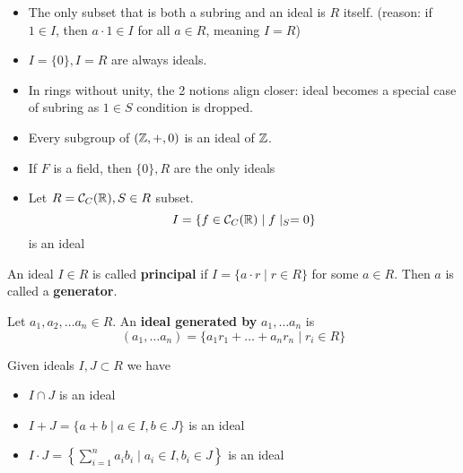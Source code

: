 \begin{rmk}\hspace{0.5cm}
    \begin{itemize}
        \item The only subset that is both a subring and an ideal is $R$ itself.
        (reason: if $1 \in I$, then $a \cdot 1 \in I$ for all $a \in R$, meaning $I = R$)
        \item $I = \{0\}, I = R$ are always ideals.
        \item In rings without unity, the 2 notions align closer: ideal becomes a special
        case of subring as $1 \in S$ condition is dropped.
    \end{itemize}
\end{rmk}
\begin{ex} \hspace{0.5cm}
    \begin{itemize}
        \item Every subgroup of $(\mathbb{Z}, +, 0)$ is an ideal of $\mathbb{Z}$.
        \item If $F$ is a field, then $\{0\}, R$ are the only ideals
        \item Let $R = \mathcal{C}_C(\mathbb{R}), S \in R$ subset.
        $$
        I = \{f \in \mathcal{C}_C(\mathbb{R}) \mid f \mid_{S} = 0 \}
        $$
        is an ideal
    \end{itemize}
\end{ex}
\begin{defn} \label{Defn 10, Jan 4}
    An ideal $I \in R$ is called \textbf{principal} if $I = \{a \cdot r \mid r \in R\}$
    for some $a \in R$. Then $a$ is called a \textbf{generator}.
\end{defn}
\begin{defn} \label{Defn 11, Jan 4}
    Let $a_1, a_2, \dots a_n \in R$. An \textbf{ideal generated by} $a_1, \dots a_n$ is
    $$
    (a_1, \dots a_n) = \{a_1r_1 + \dots + a_nr_n \mid r_i \in R\}
    $$
\end{defn}
\begin{fact} \label{Fact 12, Jan 4}
    Given ideals $I, J \subset R$ we have
    \begin{itemize}
        \item $I \cap J$ is an ideal
        \item $I + J = \{a + b \mid a \in I, b \in J \}$ is an ideal
        \item $I \cdot J = \left\{\sum\limits_{i = 1}^{n}a_ib_i \mid a_i \in I, b_i \in J \right\}$ is an ideal
    \end{itemize}
\end{fact}
